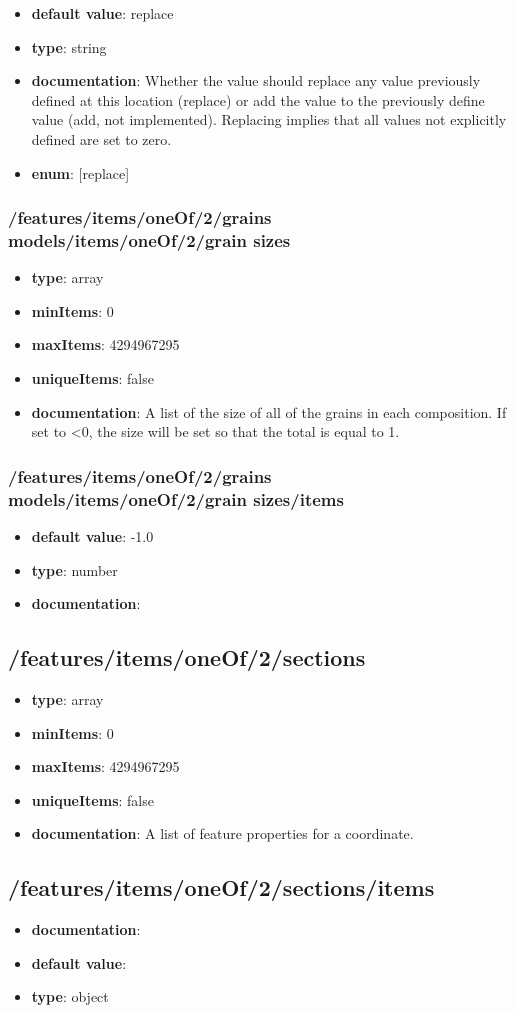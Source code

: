 \begin{itemize}\item {\bf default value}: replace
\item {\bf type}: string
\item {\bf documentation}: Whether the value should replace any value previously defined at this location (replace) or add the value to the previously define value (add, not implemented). Replacing implies that all values not explicitly defined are set to zero.
\item {\bf enum}: [replace]\end{itemize}\subsubsection{/features/items/oneOf/2/grains models/items/oneOf/2/grain sizes}
\begin{itemize}\item {\bf type}: array
\item {\bf minItems}: 0
\item {\bf maxItems}: 4294967295
\item {\bf uniqueItems}: false
\item {\bf documentation}: A list of the size of all of the grains in each composition. If set to <0, the size will be set so that the total is equal to 1.
\end{itemize}\subsubsection{/features/items/oneOf/2/grains models/items/oneOf/2/grain sizes/items}
\begin{itemize}\item {\bf default value}: -1.0
\item {\bf type}: number
\item {\bf documentation}: 
\end{itemize}\subsection{/features/items/oneOf/2/sections}
\begin{itemize}\item {\bf type}: array
\item {\bf minItems}: 0
\item {\bf maxItems}: 4294967295
\item {\bf uniqueItems}: false
\item {\bf documentation}: A list of feature properties for a coordinate.
\end{itemize}\subsection{/features/items/oneOf/2/sections/items}
\begin{itemize}\item {\bf documentation}: 
\item {\bf default value}: 
\item {\bf type}: object
\end{itemize}
